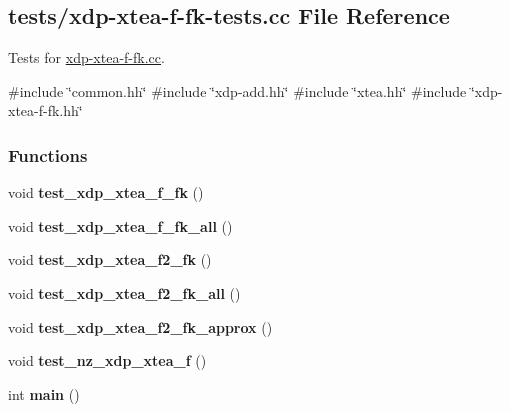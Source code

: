 \hypertarget{xdp-xtea-f-fk-tests_8cc}{\subsection{tests/xdp-\/xtea-\/f-\/fk-\/tests.cc \-File \-Reference}
\label{xdp-xtea-f-fk-tests_8cc}
}


\-Tests for \hyperlink{xdp-xtea-f-fk_8cc}{xdp-\/xtea-\/f-\/fk.\-cc}.  


{\ttfamily \#include \char`\"{}common.\-hh\char`\"{}}\*
{\ttfamily \#include \char`\"{}xdp-\/add.\-hh\char`\"{}}\*
{\ttfamily \#include \char`\"{}xtea.\-hh\char`\"{}}\*
{\ttfamily \#include \char`\"{}xdp-\/xtea-\/f-\/fk.\-hh\char`\"{}}\*
\subsubsection*{\-Functions}
\begin{DoxyCompactItemize}
\item 
\hypertarget{xdp-xtea-f-fk-tests_8cc_a786d6aaa49af1baba95188303e5f4e0b}{void {\bfseries test\-\_\-xdp\-\_\-xtea\-\_\-f\-\_\-fk} ()}\label{xdp-xtea-f-fk-tests_8cc_a786d6aaa49af1baba95188303e5f4e0b}

\item 
\hypertarget{xdp-xtea-f-fk-tests_8cc_ab388ae9b9ba70754410c6cb730dee664}{void {\bfseries test\-\_\-xdp\-\_\-xtea\-\_\-f\-\_\-fk\-\_\-all} ()}\label{xdp-xtea-f-fk-tests_8cc_ab388ae9b9ba70754410c6cb730dee664}

\item 
\hypertarget{xdp-xtea-f-fk-tests_8cc_a41dd54223c3a6ce226bc57d04d659e6e}{void {\bfseries test\-\_\-xdp\-\_\-xtea\-\_\-f2\-\_\-fk} ()}\label{xdp-xtea-f-fk-tests_8cc_a41dd54223c3a6ce226bc57d04d659e6e}

\item 
\hypertarget{xdp-xtea-f-fk-tests_8cc_a54ab017c7cf20df66676c269b218a801}{void {\bfseries test\-\_\-xdp\-\_\-xtea\-\_\-f2\-\_\-fk\-\_\-all} ()}\label{xdp-xtea-f-fk-tests_8cc_a54ab017c7cf20df66676c269b218a801}

\item 
\hypertarget{xdp-xtea-f-fk-tests_8cc_a6d4358f5758c20fea522793d95d15bf2}{void {\bfseries test\-\_\-xdp\-\_\-xtea\-\_\-f2\-\_\-fk\-\_\-approx} ()}\label{xdp-xtea-f-fk-tests_8cc_a6d4358f5758c20fea522793d95d15bf2}

\item 
\hypertarget{xdp-xtea-f-fk-tests_8cc_aa5555539222df831f02b38a989a08516}{void {\bfseries test\-\_\-nz\-\_\-xdp\-\_\-xtea\-\_\-f} ()}\label{xdp-xtea-f-fk-tests_8cc_aa5555539222df831f02b38a989a08516}

\item 
\hypertarget{xdp-xtea-f-fk-tests_8cc_ae66f6b31b5ad750f1fe042a706a4e3d4}{int {\bfseries main} ()}\label{xdp-xtea-f-fk-tests_8cc_ae66f6b31b5ad750f1fe042a706a4e3d4}

\end{DoxyCompactItemize}


